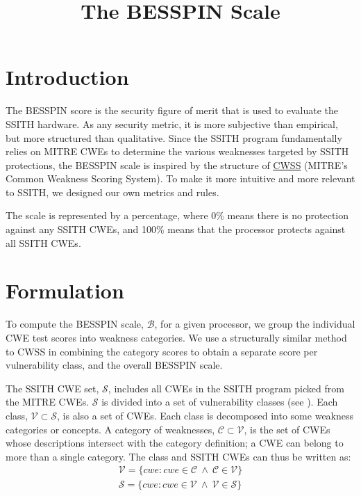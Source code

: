 \documentclass{article}
\title{The BESSPIN Scale}
\date{\vspace{-0.5cm}}
\begin{document}
\maketitle

\section{Introduction}

The BESSPIN score is the security figure of merit that is used to evaluate the SSITH hardware. As any security metric, it is more subjective than empirical, but more structured than qualitative. Since the SSITH program fundamentally relies on MITRE CWEs to determine the various weaknesses targeted by SSITH protections, the BESSPIN scale is inspired by the structure of \href{https://cwe.mitre.org/cwss/cwss_v1.0.1.html}{CWSS} (MITRE's Common Weakness Scoring System). To make it more intuitive and more relevant to SSITH, we designed our own metrics and rules.

The scale is represented by a percentage, where 0\% means there is no protection against any SSITH CWEs, and 100\% means that the processor protects against all SSITH CWEs. 

\section{Formulation}

To compute the BESSPIN scale, $\mathcal{B}$, for a given processor, we group the individual CWE test scores into weakness categories. We use a structurally similar method to CWSS in combining the category scores to obtain a separate score per vulnerability class, and the overall BESSPIN scale.

The SSITH CWE set, $\mathcal{S}$, includes all CWEs in the SSITH program picked from the MITRE CWEs. $\mathcal{S}$ is divided into a set of vulnerability classes (see ). Each class, $\mathcal{V} \subset \mathcal{S}$, is also a set of CWEs. Each class is decomposed into some weakness categories or concepts. A category of weaknesses, $\mathcal{C} \subset \mathcal{V}$, is the set of CWEs whose descriptions intersect with the category definition; a CWE can belong to more than a single category. The class and SSITH CWEs can thus be written as:
\begin{equation}
    \begin{array}{c}
        \mathcal{V} = \{ cwe : cwe \in \mathcal{C} \ \wedge \ \mathcal{C} \in \mathcal{V} \} \\
        \mathcal{S} = \{ cwe : cwe \in \mathcal{V} \ \wedge \ \mathcal{V} \in \mathcal{S} \} 
    \end{array}
\end{equation}
\end{document}
